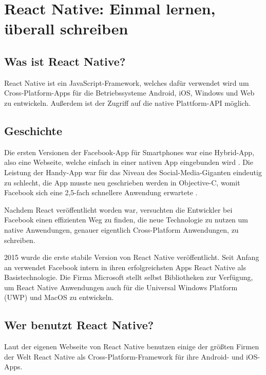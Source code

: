 \section{React Native: Einmal lernen, überall schreiben}
\label{reactnative}

\subsection{Was ist React Native?}
React Native ist ein JavaScript-Framework, welches dafür verwendet wird um Cross-Platform-Apps für
die Betriebssysteme Android, iOS, Windows und Web zu entwickeln. Außerdem ist der Zugriff auf die
native Plattform-API möglich.

\subsection{Geschichte}
Die ersten Versionen der Facebook-App für Smartphones war eine Hybrid-App, also eine Webseite,
welche einfach in einer nativen App eingebunden wird \cite{reactNativeHistory}. Die Leistung der
Handy-App war für das Niveau des Social-Media-Giganten eindeutig zu schlecht, die App musste neu
geschrieben werden in Objective-C, womit Facebook sich eine 2,5-fach schnellere Anwendung erwartete
\cite{facebookNewIosApp}.

Nachdem React veröffentlicht worden war, versuchten die Entwickler bei Facebook einen effizienten
Weg zu finden, die neue Technologie zu nutzen um native Anwendungen, genauer eigentlich
Cross-Platform Anwendungen, zu schreiben.

2015 wurde die erste stabile Version von React Native veröffentlicht. Seit Anfang an verwendet
Facebook intern in ihren erfolgreichsten Apps React Native als Basistechnologie. Die Firma Microsoft
stellt selbst Bibliotheken zur Verfügung, um React Native Anwendungen auch für die Universal Windows
Platform (UWP) und MacOS zu entwickeln.

\subsection{Wer benutzt React Native?}
Laut der eigenen Webseite von React Native benutzen einige der größten Firmen der Welt React Native
als Cross-Platform-Framework für ihre Android- und iOS-Apps.

